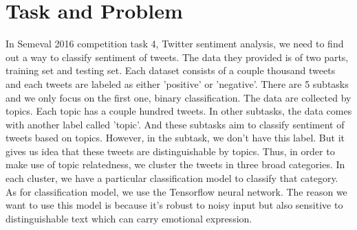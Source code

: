 \documentclass[conference]{IEEEtran}
\begin{document}
\section{Task and Problem}
In Semeval 2016 competition task 4, Twitter sentiment analysis, we need to find out a way to classify sentiment of tweets. The data they provided is of two parts, training set and testing set. Each dataset consists of a couple thousand tweets and each tweets are labeled as either 'positive' or 'negative'. There are 5 subtasks and we only focus on the first one, binary classification. The data are collected by topics. Each topic has a couple hundred tweets. In other subtasks, the data comes with another label called 'topic'. And these subtasks aim to classify sentiment of tweets based on topics. However, in the subtask, we don't have this label. But it gives us idea that these tweets are distinguishable by topics. Thus, in order to make use of topic relatedness, we cluster the tweets in three broad categories. In each cluster, we have a particular classification model to classify that category. As for classification model, we use the Tensorflow neural network. The reason we want to use this model is because it's robust to noisy input but also sensitive to distinguishable text which can carry emotional expression.
\end{document}
